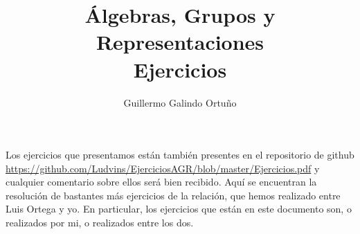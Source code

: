 \documentclass[UTF8]{article}
\begin{document}
\title{Álgebras, Grupos y Representaciones \\
      \large Ejercicios
  }

\author{Guillermo Galindo Ortuño}

\maketitle

Los ejercicios que presentamos están también presentes en el repositorio de
github \url{https://github.com/Ludvins/EjerciciosAGR/blob/master/Ejercicios.pdf}
y cualquier comentario sobre ellos será bien recibido. Aquí se encuentran la
resolución de bastantes más ejercicios de la relación, que hemos realizado entre
Luis Ortega y yo. En particular, los ejercicios que están en este documento son, o realizados por mi, o realizados entre los dos.




\end{document}
